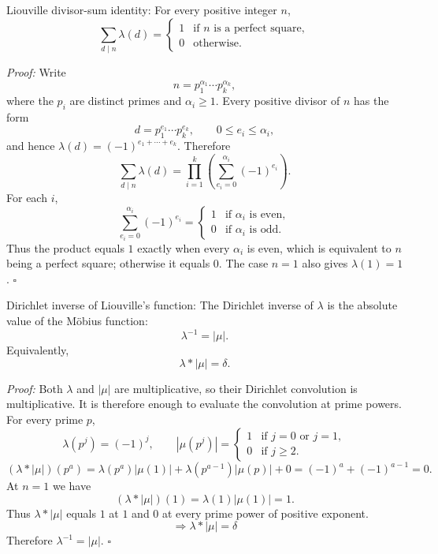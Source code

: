 \documentclass[a4paper,11pt,abstracton]{scrartcl}
\theoremstyle{dotlessP}
\theoremstyle{dotlessS}
\theoremstyle{remark}
\theoremstyle{definition}
\begin{document}
\begin{mainbox}{Liouville divisor-sum identity:}
For every positive integer $n$,
\[
    \sum_{d\mid n}\lambda(d)
      =
      \begin{cases}
          1 & \text{if $n$ is a perfect square},\\
          0 & \text{otherwise}.
      \end{cases}
\]
\end{mainbox}

\begin{claim_box}
\textit{Proof:}
Write
\[
    n=p_1^{\alpha_1}\cdots p_k^{\alpha_k},
\]
where the $p_i$ are distinct primes and $\alpha_i\geq1$.
Every positive divisor of $n$ has the form
\[
    d=p_1^{e_1}\cdots p_k^{e_k},
    \qquad 0\leq e_i\leq\alpha_i,
\]
and hence $\lambda(d)=(-1)^{e_1+\cdots+e_k}$. Therefore
\[
    \sum_{d\mid n}\lambda(d)
      =\prod_{i=1}^{k}\left(\sum_{e_i=0}^{\alpha_i}(-1)^{e_i}\right).
\]
For each $i$,
\[
    \sum_{e_i=0}^{\alpha_i}(-1)^{e_i}
      =
      \begin{cases}
          1 & \text{if $\alpha_i$ is even},\\
          0 & \text{if $\alpha_i$ is odd}.
      \end{cases}
\]
Thus the product equals $1$ exactly when every $\alpha_i$ is even,
which is equivalent to $n$ being a perfect square; otherwise it equals
$0$. The case $n=1$ also gives $\lambda(1)=1$.
\hfill$\square$
\end{claim_box}

\begin{mainbox}{Dirichlet inverse of Liouville's function:}
The Dirichlet inverse of $\lambda$ is the absolute value of the
Möbius function:
\[
    \lambda^{-1}=|\mu|.
\]
Equivalently,
\[
    \lambda*|\mu|=\delta.
\]
\end{mainbox}

\begin{claim_box}
\textit{Proof:}
Both $\lambda$ and $|\mu|$ are multiplicative, so their Dirichlet
convolution is multiplicative. It is therefore enough to evaluate the
convolution at prime powers. For every prime $p$,
\[
    \lambda(p^j)=(-1)^j,
    \qquad
    |\mu(p^j)|=
    \begin{cases}
        1 & \text{if $j=0$ or $j=1$},\\
        0 & \text{if $j\geq2$}.
    \end{cases}
\]
\[
    (\lambda*|\mu|)(p^a)
      =\lambda(p^a)|\mu(1)|
       +\lambda(p^{a-1})|\mu(p)|+0
      =(-1)^a+(-1)^{a-1}=0.
\]
At $n=1$ we have
\[
    (\lambda*|\mu|)(1)=\lambda(1)|\mu(1)|=1.
\]
Thus $\lambda*|\mu|$ equals $1$ at $1$ and $0$ at every prime power
of positive exponent.
$$\Rightarrow \lambda * |\mu| = \delta$$
Therefore $\lambda^{-1}=|\mu|$.
\hfill$\square$
\end{claim_box}
\end{document}
